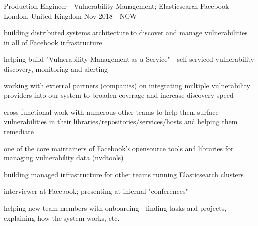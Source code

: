 
\begin{cventries}

  \cventry
    {Production Engineer - Vulnerability Management; Elasticsearch} %
    {Facebook} %
    {London, United Kingdom} %
    {Nov 2018 - NOW} %
    {
      \begin{cvitems} %
        \item {building distributed systems architecture to discover and manage vulnerabilities in all of Facebook infrastructure}
        \item {helping build "Vulnerability Management-as-a-Service" - self serviced vulnerability discovery, monitoring and alerting}
        \item {working with external partners (companies) on integrating multiple vulnerability providers into our system to broaden coverage and increase discovery speed}
        \item {cross functional work with numerous other teams to help them surface vulnerabilities in their libraries/repositories/services/hosts and helping them remediate}
        \item {one of the core maintainers of Facebook's opensource tools and libraries for managing vulnerability data (nvdtools)}
        \item {building managed infrastructure for other teams running Elasticsearch clusters}
        \item {interviewer at Facebook; presenting at internal "conferences"}
        \item {helping new team members with onboarding - finding tasks and projects, explaining how the system works, etc.}
      \end{cvitems}
    }


\end{cventries}

